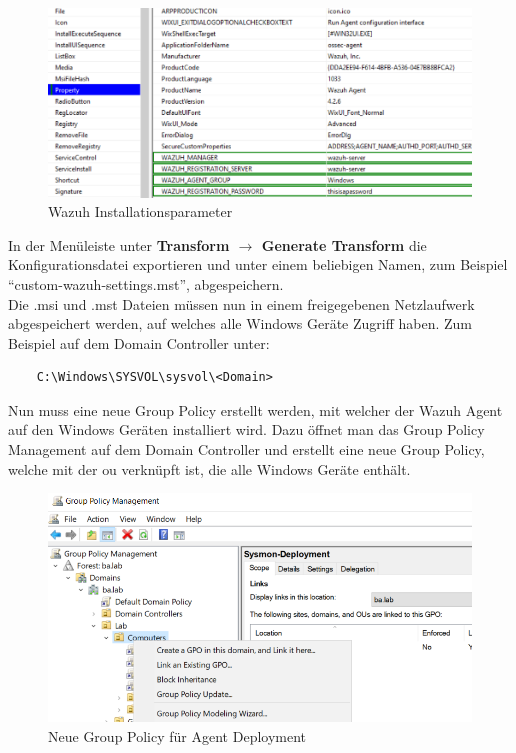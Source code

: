\begin{figure}[H]
    \centering
    \includegraphics[width=\linewidth]{../img/agent/Orca-Edit.png}
    \caption{Wazuh Installationsparameter}
\end{figure}

In der Menüleiste unter \textbf{Transform $\rightarrow$ Generate Transform} die Konfigurationsdatei exportieren und unter einem beliebigen Namen, zum Beispiel ``custom-wazuh-settings.mst'', abgespeichern.\\

Die .msi und .mst Dateien müssen nun in einem freigegebenen Netzlaufwerk abgespeichert werden, auf welches alle Windows Geräte Zugriff haben. Zum Beispiel auf dem Domain Controller unter:
\begin{lstlisting}
    C:\Windows\SYSVOL\sysvol\<Domain>
\end{lstlisting}

Nun muss eine neue Group Policy erstellt werden, mit welcher der Wazuh Agent auf den Windows Geräten installiert wird.
Dazu öffnet man das Group Policy Management auf dem Domain Controller und erstellt eine neue Group Policy, welche mit der \acrshort{ou} verknüpft ist, die alle Windows Geräte enthält.
\begin{figure}[H]
    \centering
    \includegraphics[width=\linewidth]{../img/agent/create-new-group-policy.png}
    \caption{Neue Group Policy für Agent Deployment}
\end{figure}

